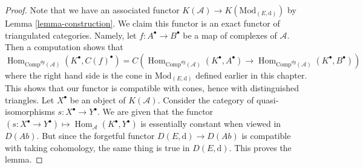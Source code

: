 \documentclass{stacks-project}
\theoremstyle{plain}
\theoremstyle{definition}
\theoremstyle{remark}
\numberwithin{equation}{subsection}
\def\Hom{\mathop{\mathrm{Hom}}\nolimits}
\begin{document}
\begin{proof}
Note that we have an associated functor
$K(\mathcal{A}) \to K(\text{Mod}_{(E, \text{d})})$ by
Lemma \ref{lemma-construction}.
We claim this functor is an exact functor of triangulated categories.
Namely, let $f : A^\bullet \to B^\bullet$ be a map of complexes
of $\mathcal{A}$. Then a computation shows that
$$
\Hom_{\text{Comp}^{dg}(\mathcal{A})}(K^\bullet, C(f)^\bullet)
=
C\left(
\Hom_{\text{Comp}^{dg}(\mathcal{A})}(K^\bullet, A^\bullet) \to
\Hom_{\text{Comp}^{dg}(\mathcal{A})}(K^\bullet, B^\bullet)
\right)
$$
where the right hand side is the cone in $\text{Mod}_{(E, \text{d})}$
defined earlier in this chapter.
This shows that our functor is compatible with cones, hence with
distinguished triangles. Let $X^\bullet$ be an object of $K(\mathcal{A})$.
Consider the category of quasi-isomorphisms $s : X^\bullet \to Y^\bullet$.
We are given that the functor
$(s : X^\bullet \to Y^\bullet) \mapsto \Hom_\mathcal{A}(K^\bullet, Y^\bullet)$
is essentially constant when viewed in $D(\textit{Ab})$.
But since the forgetful functor $D(E, \text{d}) \to D(\textit{Ab})$
is compatible with taking cohomology, the same thing is true in
$D(E, \text{d})$. This proves the lemma.
\end{proof}
\end{document}
